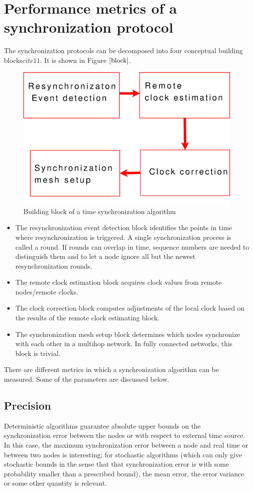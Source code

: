 \documentclass[a4paper,10pt]{report}
\begin{document}
\section{\textbf{Performance metrics of a synchronization protocol}}
The synchronization protocols can be decomposed into four conceptual building blocks$cite{11}$. It is shown in Figure
$\ref{block}$.
\begin{figure}
 \centering
\includegraphics[width= 0.6 \textwidth]{buildingblock}
\caption{Building block of a time synchronization algorithm}
\label{block}
\end{figure}
\begin{itemize}
\item The resynchronization event detection block identifies the points in time where resynchronization is triggered. A single synchronization process is called a round. If rounds can overlap in time, sequence numbers are needed to distinguish them and to let a node ignore all but the newest resynchronization rounds.
\item The remote clock estimation block acquires clock values from remote nodes/remote clocks.
\item The clock correction block computes adjustments of the local clock based on the results of the remote clock estimating block.
\item The synchronization mesh setup block determines which nodes synchronize with each other in a multihop network. In fully connected networks, this block is trivial.
\end{itemize}
There are different metrics in which a synchronization algorithm can be measured. Some of the parameters are discussed below.
\subsection{\textbf{Precision}}
Deterministic algorithms guarantee absolute upper bounds on the synchronization error between the nodes or with respect to external time source. In this case, the maximum synchronization error between a node and real time or between two nodes is interesting; for stochastic algorithms (which can only give stochastic bounds in the sense that that synchronization error is with some probability smaller than a prescribed bound), the mean error, the error variance or some other quantity is relevant.
\end{document}
